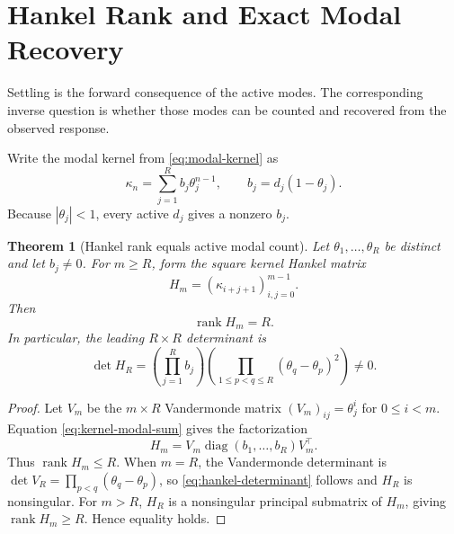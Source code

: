 \documentclass[10pt,twocolumn]{article}
\newtheorem{theorem}{Theorem}
\newcommand{\rank}{\operatorname{rank}}
\begin{document}
\section{Hankel Rank and Exact Modal Recovery}

Settling is the forward consequence of the active modes.  The corresponding
inverse question is whether those modes can be counted and recovered from the
observed response.

Write the modal kernel from \eqref{eq:modal-kernel} as
\begin{equation}\label{eq:kernel-modal-sum}
 \kappa_n=\sum_{j=1}^{R}b_j\theta_j^{n-1},
 \qquad
 b_j=d_j(1-\theta_j).
\end{equation}
Because $|\theta_j|<1$, every active $d_j$ gives a nonzero $b_j$.

\begin{theorem}[Hankel rank equals active modal count]\label{thm:hankel-rank}
Let $\theta_1,\ldots,\theta_R$ be distinct and let $b_j\ne0$.  For $m\geq R$,
form the square kernel Hankel matrix
\begin{equation}\label{eq:hankel-matrix}
 H_m=(\kappa_{i+j+1})_{i,j=0}^{m-1}.
\end{equation}
Then
\begin{equation}\label{eq:hankel-rank}
 \rank H_m=R.
\end{equation}
In particular, the leading $R\times R$ determinant is
\begin{equation}\label{eq:hankel-determinant}
 \det H_R
 =
 \left(\prod_{j=1}^{R}b_j\right)
 \left(\prod_{1\leq p<q\leq R}
 (\theta_q-\theta_p)^2\right)
 \ne0.
\end{equation}
\end{theorem}

\begin{proof}
Let $V_m$ be the $m\times R$ Vandermonde matrix
$(V_m)_{ij}=\theta_j^i$ for $0\leq i<m$.  Equation
\eqref{eq:kernel-modal-sum} gives the factorization
\begin{equation}\label{eq:hankel-factorization}
 H_m=V_m\operatorname{diag}(b_1,\ldots,b_R)V_m^\top.
\end{equation}
Thus $\rank H_m\leq R$.  When $m=R$, the Vandermonde determinant is
$\det V_R=\prod_{p<q}(\theta_q-\theta_p)$, so
\eqref{eq:hankel-determinant} follows and $H_R$ is nonsingular.  For $m>R$,
$H_R$ is a nonsingular principal submatrix of $H_m$, giving
$\rank H_m\geq R$.  Hence equality holds.
\end{proof}
\end{document}

